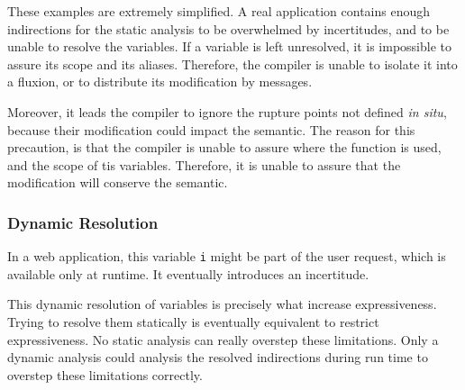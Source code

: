 These examples are extremely simplified.
A real application contains enough indirections for the static analysis to be overwhelmed by incertitudes, and to be unable to resolve the variables.
If a variable is left unresolved, it is impossible to assure its scope and its aliases.
Therefore, the compiler is unable to isolate it into a fluxion, or to distribute its modification by messages.

Moreover, it leads the compiler to ignore the rupture points not defined \textit{in situ}, because their modification could impact the semantic.
The reason for this precaution, is that the compiler is unable to assure where the function is used, and the scope of tis variables.
Therefore, it is unable to assure that the modification will conserve the semantic.

\subsubsection{Dynamic Resolution}

In a web application, this variable \texttt{i} might be part of the user request, which is available only at runtime.
It eventually introduces an incertitude.

This dynamic resolution of variables is precisely what increase expressiveness.
Trying to resolve them statically is eventually equivalent to restrict expressiveness.
No static analysis can really overstep these limitations.
Only a dynamic analysis could analysis the resolved indirections during run time to overstep these limitations correctly.


